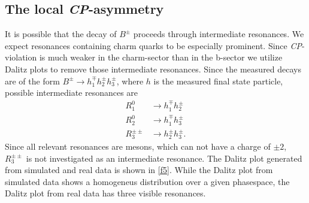 
\subsection{The local \textit{CP}-asymmetry}
It is possible that the decay of $B^\pm$ proceeds through intermediate resonances. We expect resonances containing charm quarks
to be especially prominent. Since \textit{CP}-violation is much weaker in the charm-sector than in the b-sector we utilize
Dalitz plots to remove those intermediate resonances. Since the measured decays are of the form $B^\pm \rightarrow h_1^\mp h_2^\pm h_3^\pm$,
where $h$ is the measured final state particle, possible intermediate resonances are
\begin{align*}
  R_1^0 &\rightarrow h_1^\mp h_2^\pm \\
  R_2^0 &\rightarrow h_1^\mp h_3^\pm \\
  R_3^{\pm \pm} &\rightarrow h_2^\pm h_3^\pm .
\end{align*}
Since all relevant resonances are mesons, which can not have a charge of $\pm 2$, $R_3^{\pm \pm}$ is not investigated as an intermediate resonance.
The Dalitz plot generated from simulated and real data is shown in \autoref{f5}.
While the Dalitz plot from simulated data shows a homogeneus distribution over a given phasespace, the Dalitz plot from real data has three visible
resonances.

